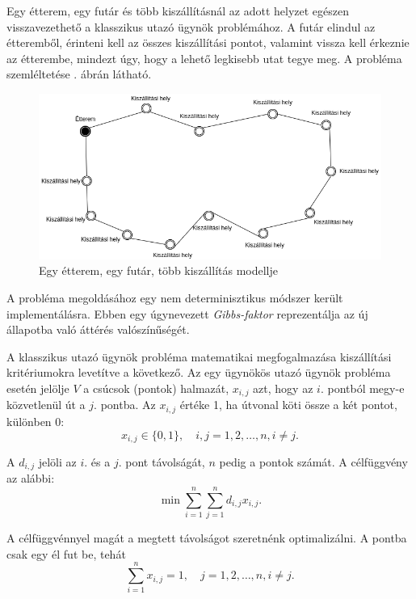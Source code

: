 

Egy étterem, egy futár és több kiszállításnál az adott helyzet egészen visszavezethető a klasszikus utazó ügynök problémához.
A futár elindul az étteremből, érinteni kell az összes kiszállítási pontot, valamint vissza kell érkeznie az étterembe, mindezt úgy, hogy a lehető legkisebb utat tegye meg.
A probléma szemléltetése . ábrán látható.

\begin{figure}[h!]
\centering
\includegraphics[scale=0.5]{images/Simpletsp.png}
\caption{Egy étterem, egy futár, több kiszállítás modellje}
\label{fig:model2}
\end{figure}


A probléma megoldásához egy nem determinisztikus módszer került implementálásra.
Ebben egy úgynevezett \textit{Gibbs-faktor} reprezentálja az új állapotba való áttérés valószínűségét.

A klasszikus utazó ügynök probléma matematikai megfogalmazása kiszállítási kritériumokra levetítve a következő.
Az egy ügynökös utazó ügynök probléma esetén jelölje $V$ a csúcsok (pontok) halmazát, $x_{i,j}$ azt, hogy az $i.$ pontból megy-e közvetlenül út a $j.$ pontba. Az $x_{i,j}$ értéke 1, ha útvonal köti össze a két pontot, különben 0:
\[
x_{i, j} \in \{0, 1\}, \quad i, j = 1, 2, \ldots, n, i \neq j.
\]

A $d_{i,j}$ jelöli az $i.$ és a $j.$ pont távolságát, $n$ pedig a pontok számát. A célfüggvény az alábbi:
\[
\displaystyle
\min \sum_{i=1}^n \sum_{j=1}^n d_{i,j} x_{i,j}.
\]

A célfüggvénnyel magát a megtett távolságot szeretnénk optimalizálni. A pontba csak egy él fut be, tehát
\[
\displaystyle
\sum_{i=1}^n x_{i,j} = 1, \quad j = 1, 2, \ldots, n, i \neq j.
\]

